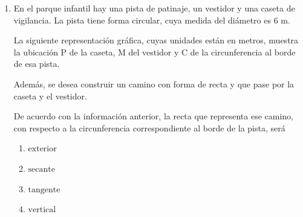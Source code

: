 \documentclass[12pt]{article}
\newcommand{\opcion}[2]{\item $#2$}
\newcommand{\puntografico}{0.09}
\newcommand{\puntodestacado}{0.16}
\newcommand{\rotuloxeste}{\mbox{x (este)}}
\newcommand{\rotuloynorte}{\mbox{y (norte)}}
\begin{document}
\begin{enumerate}[label=\textbf{\arabic*.}, itemsep=2.5cm]
De acuerdo con la informaci\'on anterior, si el radio del mirador mide $5$ m, entonces, \textquestiondown a qu\'e distancia est\'a la persona del centro del mirador?

\begin{enumerate}[label=\Alph*)]
  \opcion{A}{10,9\text{ m}}
  \opcion{B}{13,0\text{ m}}
  \opcion{C}{24,5\text{ m}}
  \opcion{D}{28,3\text{ m}}
\end{enumerate}

\Needspace{0.90\textheight}
\item
En el parque infantil hay una pista de patinaje, un vestidor y una caseta de vigilancia. La pista tiene forma circular, cuya medida del di\'ametro es $6$ m.

La siguiente representaci\'on gr\'afica, cuyas unidades est\'an en metros, muestra la ubicaci\'on P de la caseta, M del vestidor y C de la circunferencia al borde de esa pista.

\begin{center}
\end{center}

Adem\'as, se desea construir un camino con forma de recta y que pase por la caseta y el vestidor.

De acuerdo con la informaci\'on anterior, la recta que representa ese camino, con respecto a la circunferencia correspondiente al borde de la pista, ser\'a

\begin{enumerate}[label=\Alph*)]
  \opcion{A}{\text{exterior}}
  \opcion{B}{\text{secante}}
  \opcion{C}{\text{tangente}}
  \opcion{D}{\text{vertical}}
\end{enumerate}


\end{enumerate}
\end{document}
